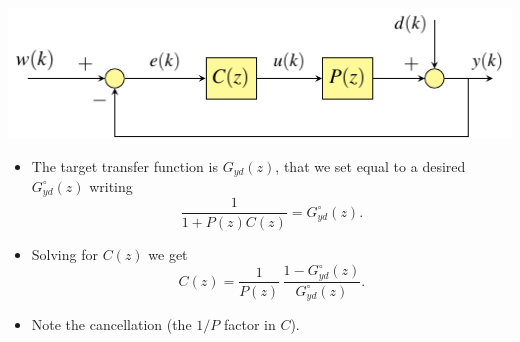 \begin{frame}
\framesubtitleTC{}
\myPause
 \begin{center}
  \includegraphics[width=0.50\columnwidth]{./Unit-04/img/ControlLoop-H1.pdf}
 \end{center}
 \begin{itemize}[<+-| alert@+>]
 \item The target transfer function is $G_{yd}(z)$, that we set equal to a desired $G_{yd}^{\circ}(z)$ writing
       \begin{displaymath} 
       \frac{1}{1+P(z)C(z)} = G_{yd}^{\circ}(z).
       \end{displaymath}
 \item Solving for $C(z)$ we get
       \begin{displaymath} 
        C(z) = \frac{1}{P(z)} \, \frac{1-G_{yd}^{\circ}(z)}{G_{yd}^{\circ}(z)}.
       \end{displaymath}
 \item Note the cancellation (the $1/P$ factor in $C$).
 \end{itemize}
\end{frame}


